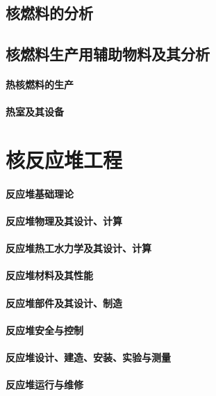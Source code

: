 \documentclass[UTF8]{../../ApplicationUniverse}
\begin{document}
\section{核燃料的分析}
\section{核燃料生产用辅助物料及其分析}
    \subsubsection{热核燃料的生产}
    \subsubsection{热室及其设备}








\chapter{核反应堆工程}
\subsubsection{反应堆基础理论}
\subsubsection{反应堆物理及其设计、计算}
\subsubsection{反应堆热工水力学及其设计、计算}
\subsubsection{反应堆材料及其性能}
\subsubsection{反应堆部件及其设计、制造}
\subsubsection{反应堆安全与控制}
\subsubsection{反应堆设计、建造、安装、实验与测量}
\subsubsection{反应堆运行与维修}
\end{document}
